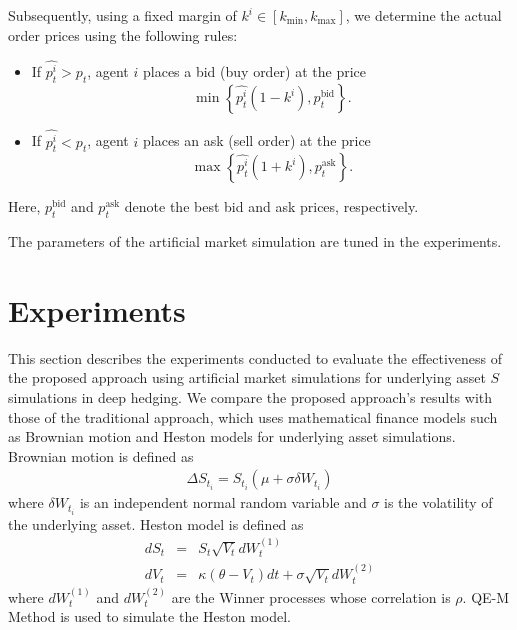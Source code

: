 Subsequently, using a fixed margin of $k^i \in [k_{\mathrm{min}}, k_{\mathrm{max}}]$, we determine the actual order prices using the following rules:
\begin{itemize}
    \item If $\widehat{p_t^i} > p_t$, agent $i$ places a bid (buy order) at the price
          \begin{equation}
              \min{\left\{\widehat{p_t^i} (1-k^i), p_{t}^{\mathrm{bid}}\right\}}.
          \end{equation}
    \item If $\widehat{p_t^i} < p_t$, agent $i$ places an ask (sell order) at the price
          \begin{equation}
              \max{\left\{\widehat{p_t^i} (1+k^i), p_{t}^{\mathrm{ask}}\right\}}.
          \end{equation}
\end{itemize}
Here, $p_{t}^{\mathrm{bid}}$ and $p_{t}^{\mathrm{ask}}$ denote the best bid and ask prices, respectively.

The parameters of the artificial market simulation are tuned in the experiments.

\section{Experiments}
This section describes the experiments conducted to evaluate the effectiveness of the proposed approach using artificial market simulations for underlying asset $S$ simulations in deep hedging.
We compare the proposed approach's results with those of the traditional approach, which uses mathematical finance models such as Brownian motion and Heston models for underlying asset simulations.
Brownian motion is defined as
\begin{eqnarray}
    \Delta S_{t_i} = S_{t_i} ( \mu + \sigma \delta W_{t_i})
\end{eqnarray}
where $\delta W_{t_i}$ is an independent normal random variable and $\sigma$ is the volatility of the underlying asset.
Heston model is defined as
\begin{eqnarray}
    d S_t &=& S_t \sqrt{V_t} dW^{(1)}_t\\
    dV_t &=& \kappa (\theta - V_t) dt + \sigma \sqrt{V_t} dW^{(2)}_t
\end{eqnarray}
where $dW^{(1)}_t$ and $dW^{(2)}_t$ are the Winner processes whose correlation is $\rho$.
QE-M Method \cite{andersen2007} is used to simulate the Heston model.

